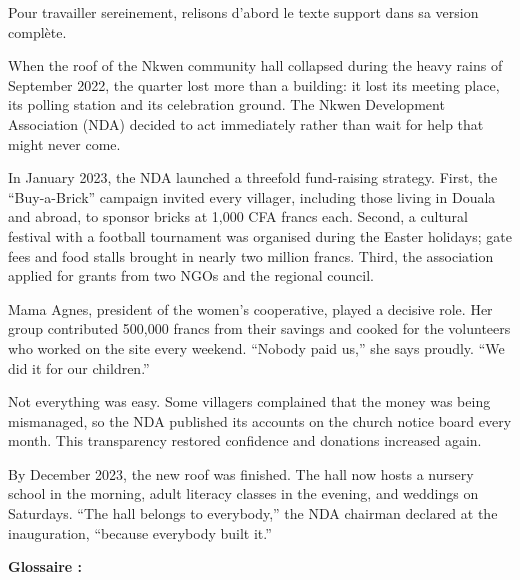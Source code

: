 \documentclass[11pt]{article}
\begin{document}
Pour travailler sereinement, relisons d'abord le texte support dans sa version complète.

\begin{textebox}
When the roof of the Nkwen community hall collapsed during the heavy rains of September 2022, the quarter lost more than a building: it lost its meeting place, its polling station and its celebration ground. The Nkwen Development Association (NDA) decided to act immediately rather than wait for help that might never come.

In January 2023, the NDA launched a threefold fund-raising strategy. First, the “Buy-a-Brick” campaign invited every villager, including those living in Douala and abroad, to sponsor bricks at 1,000 CFA francs each. Second, a cultural festival with a football tournament was organised during the Easter holidays; gate fees and food stalls brought in nearly two million francs. Third, the association applied for grants from two NGOs and the regional council.

Mama Agnes, president of the women's cooperative, played a decisive role. Her group contributed 500,000 francs from their savings and cooked for the volunteers who worked on the site every weekend. “Nobody paid us,” she says proudly. “We did it for our children.”

Not everything was easy. Some villagers complained that the money was being mismanaged, so the NDA published its accounts on the church notice board every month. This transparency restored confidence and donations increased again.

By December 2023, the new roof was finished. The hall now hosts a nursery school in the morning, adult literacy classes in the evening, and weddings on Saturdays. “The hall belongs to everybody,” the NDA chairman declared at the inauguration, “because everybody built it.”
\end{textebox}

\textbf{Glossaire :}
\end{document}
